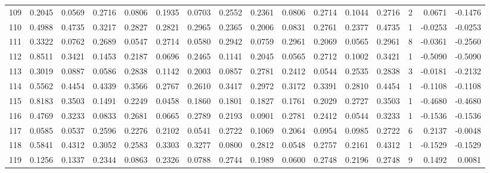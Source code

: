 \begin{tabular}{lrrrrrrrrrrrrrrr}
109 &      0.2045 &  0.0569 &  0.2716 &  0.0806 &  0.1935 &  0.0703 &  0.2552 &  0.2361 &  0.0806 &  0.2714 &   0.1044 &     0.2716 &      2 &                    0.0671 &                    -0.1476 \\
110 &      0.4988 &  0.4735 &  0.3217 &  0.2827 &  0.2821 &  0.2965 &  0.2365 &  0.2006 &  0.0831 &  0.2761 &   0.2377 &     0.4735 &      1 &                   -0.0253 &                    -0.0253 \\
111 &      0.3322 &  0.0762 &  0.2689 &  0.0547 &  0.2714 &  0.0580 &  0.2942 &  0.0759 &  0.2961 &  0.2069 &   0.0565 &     0.2961 &      8 &                   -0.0361 &                    -0.2560 \\
112 &      0.8511 &  0.3421 &  0.1453 &  0.2187 &  0.0696 &  0.2465 &  0.1141 &  0.2045 &  0.0565 &  0.2712 &   0.1002 &     0.3421 &      1 &                   -0.5090 &                    -0.5090 \\
113 &      0.3019 &  0.0887 &  0.0586 &  0.2838 &  0.1142 &  0.2003 &  0.0857 &  0.2781 &  0.2412 &  0.0544 &   0.2535 &     0.2838 &      3 &                   -0.0181 &                    -0.2132 \\
114 &      0.5562 &  0.4454 &  0.4339 &  0.3566 &  0.2767 &  0.2610 &  0.3417 &  0.2972 &  0.3172 &  0.3391 &   0.2810 &     0.4454 &      1 &                   -0.1108 &                    -0.1108 \\
115 &      0.8183 &  0.3503 &  0.1491 &  0.2249 &  0.0458 &  0.1860 &  0.1801 &  0.1827 &  0.1761 &  0.2029 &   0.2727 &     0.3503 &      1 &                   -0.4680 &                    -0.4680 \\
116 &      0.4769 &  0.3233 &  0.0833 &  0.2681 &  0.0665 &  0.2789 &  0.2193 &  0.0901 &  0.2781 &  0.2412 &   0.0544 &     0.3233 &      1 &                   -0.1536 &                    -0.1536 \\
117 &      0.0585 &  0.0537 &  0.2596 &  0.2276 &  0.2102 &  0.0541 &  0.2722 &  0.1069 &  0.2064 &  0.0954 &   0.0985 &     0.2722 &      6 &                    0.2137 &                    -0.0048 \\
118 &      0.5841 &  0.4312 &  0.3052 &  0.2583 &  0.3303 &  0.3277 &  0.0800 &  0.2812 &  0.0548 &  0.2757 &   0.2161 &     0.4312 &      1 &                   -0.1529 &                    -0.1529 \\
119 &      0.1256 &  0.1337 &  0.2344 &  0.0863 &  0.2326 &  0.0788 &  0.2744 &  0.1989 &  0.0600 &  0.2748 &   0.2196 &     0.2748 &      9 &                    0.1492 &                     0.0081 \\

\end{tabular}
